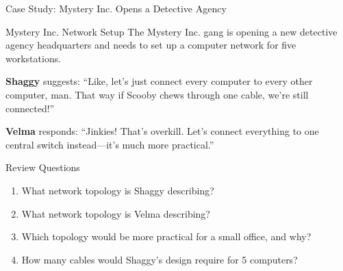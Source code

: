 \documentclass[aspectratio=169]{beamer}  %
\begin{document}
\begin{frame}{Case Study: Mystery Inc. Opens a Detective Agency}
    \begin{casestudy}{Mystery Inc. Network Setup}
        The Mystery Inc. gang is opening a new detective agency headquarters and needs to set up a computer network for five workstations.
        
        \vspace{0.5em}
        \textbf{Shaggy} suggests: ``Like, let's just connect every computer to every other computer, man. That way if Scooby chews through one cable, we're still connected!''
        
        \vspace{0.5em}
        \textbf{Velma} responds: ``Jinkies! That's overkill. Let's connect everything to one central switch instead---it's much more practical.''
    \end{casestudy}
    
    \begin{block}{Review Questions}
        \begin{enumerate}
            \item What network topology is Shaggy describing?
            \item What network topology is Velma describing?
            \item Which topology would be more practical for a small office, and why?
            \item How many cables would Shaggy's design require for 5 computers?
        \end{enumerate}
    \end{block}
\end{frame}
\end{document}
